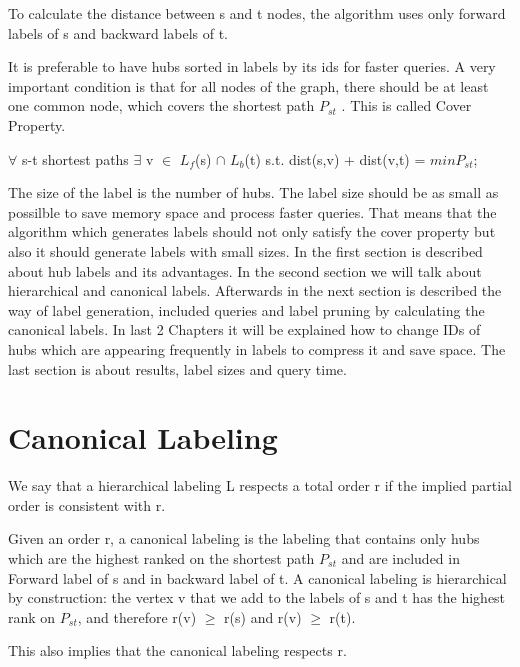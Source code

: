 \documentclass[english,draft]{article}
\begin{document}
To calculate the distance between s and t nodes, the algorithm uses only forward labels of s and backward labels of t. 

It is preferable to have hubs sorted in labels by its ids for faster queries.
A very important condition is that for all nodes of the graph, there should be at least one common node, which covers the shortest path ${P}_{st}$ . This is called Cover Property. 

\begin{center}
			$\forall$ s-t shortest paths 
			$\exists$ v $\in$ ${L}_{f}$(s) $\cap$ ${L}_{b}$(t) 
			  s.t. dist(s,v) + dist(v,t) = $min {P}_{st}$;
\end{center}
The size of the label is the number of hubs. 
The label size should be as small as possilble to save memory space and process faster queries. 
That means that the algorithm which generates labels should not only satisfy the cover property but also it should
generate labels with small sizes.
In the first section is described about hub labels and its advantages. 
In the second section we will talk about hierarchical and canonical labels. 
Afterwards in the next section is described the way of label generation, included queries and label pruning by
calculating the canonical labels. 
In last 2 Chapters it will be explained how to change IDs of hubs which are appearing frequently in labels to compress
it and save space.
The last section is about results, label sizes and query time.

\section{Canonical Labeling}
	We say that a hierarchical labeling L respects a total order r if the implied partial order is consistent with r. 

	Given an order r, a canonical labeling is the labeling that contains only hubs which are the highest ranked on the
		shortest path ${P}_{st}$ and are included in Forward label of s and in backward label of t.
			A canonical labeling is hierarchical by construction: the vertex v that we add to the labels of s and t
			has the 	highest rank on ${P}_{st}$, and therefore r(v) $\geq$ r(s) and r(v) $\geq$ r(t).

				This also implies that the canonical labeling respects r. \\

\newtheorem{H_in_C}{Theorem}
\end{document}
